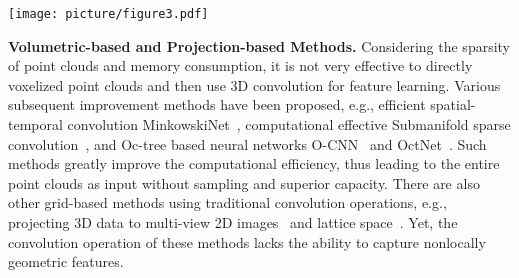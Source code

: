 \documentclass[10pt,twocolumn,letterpaper]{article}
\begin{document}
	
	\begin{figure*}
		\begin{center}
			\begin{center}
				\texttt{[image: picture/figure3.pdf]}
			\end{center}
		\end{center}
		\caption{Part (a) shows adaptive sampling (AS) module, which firstly updates features of grouping point by reasoning group relationship, then normalized weighs re-weight initial sampled points to achieve new sampled points. Part (b) illustrates the construction of local-nonlocal (L-NL) module, which consists of point local cell and point nonlocal cell. $N_s$ stands for sampled point number, $N$ stands for point number of entire point clouds, $D_l, D_{mid}$, and $D_{l+1}$ stand for channel numbers.}
		\label{fig:ASModule}
		\vspace{-0.3cm}
	\end{figure*}
	{\noindent\bf Volumetric-based and Projection-based Methods.}
	Considering the sparsity of point clouds and memory consumption, it is not very effective to directly voxelized point clouds and then use 3D convolution for feature learning. Various subsequent improvement methods have been proposed, e.g., efficient spatial-temporal convolution MinkowskiNet~\cite{choy20194d}, computational effective Submanifold sparse convolution~\cite{SparseConv}, and Oc-tree based neural networks O-CNN~\cite{wang2017cnn} and OctNet~\cite{riegler2017octnet}. Such methods greatly improve the computational efficiency, thus leading to the entire point clouds as input without sampling and superior capacity. There are also other grid-based methods using traditional convolution operations, e.g., projecting 3D data to multi-view 2D images~\cite{su2015multi} and lattice space~\cite{su2018splatnet}. Yet, the convolution operation of these methods lacks the ability to capture nonlocally geometric features. 
	
\end{document}
